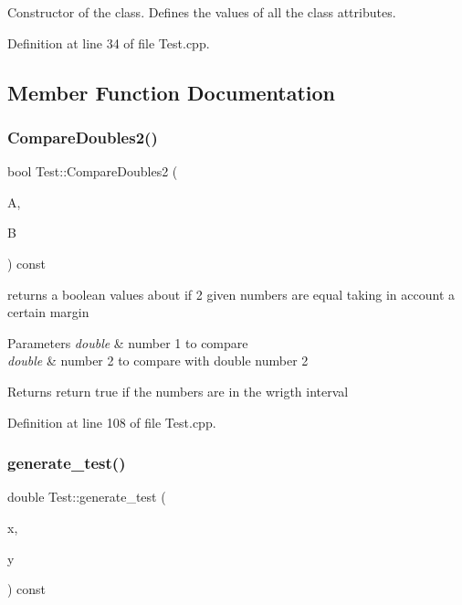 Constructor of the class. Defines the values of all the class attributes. 



Definition at line 34 of file Test.\+cpp.



\subsection{Member Function Documentation}
\mbox{\label{class_test_abdad04cdc0b60534db1fd18daa2c7f01}} 
\subsubsection{\texorpdfstring{Compare\+Doubles2()}{CompareDoubles2()}}
{\footnotesize\ttfamily bool Test\+::\+Compare\+Doubles2 (\begin{DoxyParamCaption}\item[{double const \&}]{A,  }\item[{double const \&}]{B }\end{DoxyParamCaption}) const}



returns a boolean values about if 2 given numbers are equal taking in account a certain margin 


\begin{DoxyParams}{Parameters}
{\em double} & number 1 to compare \\
\hline
{\em double} & number 2 to compare with double number 2 \\
\hline
\end{DoxyParams}
\begin{DoxyReturn}{Returns}
return true if the numbers are in the wrigth interval 
\end{DoxyReturn}


Definition at line 108 of file Test.\+cpp.

\mbox{\label{class_test_a80c91a350570efe1b80484dc2ecc8c66}} 
\subsubsection{\texorpdfstring{generate\+\_\+test()}{generate\_test()}}
{\footnotesize\ttfamily double Test\+::generate\+\_\+test (\begin{DoxyParamCaption}\item[{vector$<$ double $>$ const \&}]{x,  }\item[{vector$<$ double $>$ const \&}]{y }\end{DoxyParamCaption}) const}



